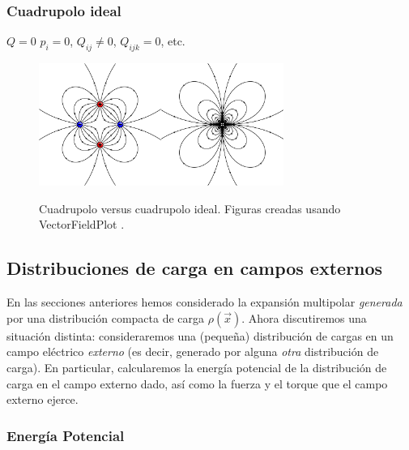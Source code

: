 \subsubsection{Cuadrupolo ideal}
$Q=0$ $p_i=0$, $Q_{ij}\neq 0$, $Q_{ijk}=0$, etc.

\begin{figure}[H]
\begin{center}
\includegraphics[height=4cm]{fig/fig-E-03.pdf}\hspace{1cm}\includegraphics[height=4cm]{fig/fig-campo-cuadrupolo-electrico-ideal.pdf} 
\caption{Cuadrupolo versus cuadrupolo ideal. Figuras creadas usando VectorFieldPlot \cite{VFP}.}
\label{fig-dipolos2}
\end{center}
\end{figure}
\newpage


\subsection{Distribuciones de carga en campos externos} \label{ed3_3}

En las secciones anteriores hemos considerado la expansión multipolar
\textit{generada} por una distribución compacta de carga
$\rho(\vec{x})$. Ahora discutiremos una situación distinta: consideraremos
una (peque\~na) distribución de cargas en un campo eléctrico
\textit{externo} (es decir, generado por alguna \textit{otra} distribución de
carga). En particular, calcularemos la energía potencial de la
distribución de carga en el campo externo dado, así como la fuerza y el
torque que el campo externo ejerce.

\subsubsection{Energía Potencial} \label{ed3_3_1}


